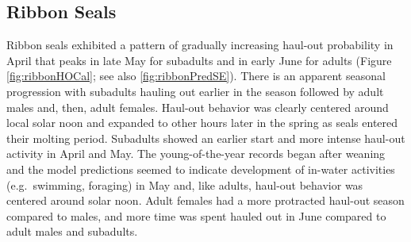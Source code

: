 \documentclass[fleqn,10pt,lineno]{wlpeerj} %
\begin{document}
\subsection*{Ribbon Seals}\label{ribbon-seals}

Ribbon seals exhibited a pattern of gradually increasing haul-out probability in
April that peaks in late May for subadults and in early June for adults (Figure
\ref{fig:ribbonHOCal}; see also \ref{fig:ribbonPredSE}). There is an apparent
seasonal progression with subadults hauling out earlier in the season followed
by adult males and, then, adult females. Haul-out behavior was clearly centered
around local solar noon and expanded to other hours later in the spring as seals
entered their molting period. Subadults showed an earlier start and more intense
haul-out activity in April and May. The young-of-the-year records began after
weaning and the model predictions seemed to indicate development of in-water
activities (e.g.~swimming, foraging) in May and, like adults, haul-out behavior
was centered around solar noon. Adult females had a more protracted
haul-out season compared to males, and more time was spent hauled out in June
compared to adult males and subadults.
\end{document}
